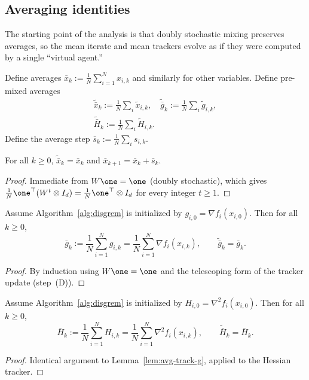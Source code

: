 \documentclass[review,onefignum,onetabnum]{siamart171218}
\begin{document}
\subsection{Averaging identities}\label{ssec:avg}
The starting point of the analysis is that doubly stochastic mixing
preserves averages, so the mean iterate and mean trackers evolve as if
they were computed by a single ``virtual agent.''

Define averages $\bar x_k:=\frac1N\sum_{i=1}^N x_{i,k}$ and similarly for other variables.
Define pre-mixed averages
\begin{gather*}
\tilde{\bar x}_k:=\tfrac1N\!\sum_i \tilde x_{i,k},\quad
\tilde{\bar g}_k:=\tfrac1N\!\sum_i \tilde g_{i,k},\\
\tilde{\bar H}_k:=\tfrac1N\!\sum_i \tilde H_{i,k}.
\end{gather*}
Define the average step $\bar s_k:=\frac1N\sum_i s_{i,k}$.

\begin{lemma}\label{lem:avg-pres}
For all $k\ge0$, $\tilde{\bar x}_k=\bar x_k$ and $\bar x_{k+1}=\bar x_k+\bar s_k$.
\end{lemma}
\begin{proof}
Immediate from $W\one=\one$ (doubly stochastic),
which gives $\frac1N\one^\top(W^t\otimes I_d)=\frac1N\one^\top\otimes I_d$
for every integer $t\ge 1$.
\end{proof}

\begin{lemma}\label{lem:avg-track-g}
Assume Algorithm~\ref{alg:disgrem} is initialized by $g_{i,0}=\nabla f_i(x_{i,0})$.
Then for all $k\ge0$,
\[
\bar g_k:=\frac1N\sum_{i=1}^N g_{i,k}=\frac1N\sum_{i=1}^N\nabla f_i(x_{i,k}),
\qquad
\tilde{\bar g}_k=\bar g_k.
\]
\end{lemma}
\begin{proof}
By induction using $W\one=\one$ and the telescoping form of the tracker update (step~(D)).
\end{proof}

\begin{lemma}\label{lem:avg-track-h}
Assume Algorithm~\ref{alg:disgrem} is initialized by $H_{i,0}=\nabla^2 f_i(x_{i,0})$.
Then for all $k\ge0$,
\[
\bar H_k:=\frac1N\sum_{i=1}^N H_{i,k}=\frac1N\sum_{i=1}^N\nabla^2 f_i(x_{i,k}),
\qquad
\tilde{\bar H}_k=\bar H_k.
\]
\end{lemma}
\begin{proof}
Identical argument to Lemma~\ref{lem:avg-track-g}, applied to the Hessian tracker.
\end{proof}
\end{document}
